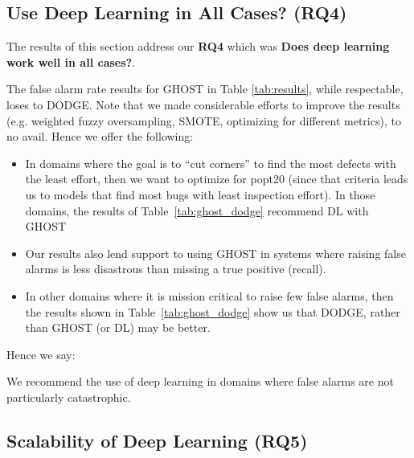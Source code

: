 \documentclass[10pt,compsoc,twocolumn]{IEEEtran}
\newcommand{\bi}{\begin{itemize}}
\newcommand{\ei}{\end{itemize}}
\newcommand{\BLUE}{\color{blue}}
\newcommand{\BLACK}{\color{black}}
\begin{document}
\subsection{Use Deep Learning in All Cases? (RQ4)}
\label{sec:rq4}

The results of this section address our \textbf{RQ4} which was \textbf{Does deep learning work well in all cases?}.

The false alarm rate results for GHOST in Table \ref{tab:results}, while respectable, loses to DODGE.  Note that we made considerable efforts to improve the results (e.g. weighted fuzzy oversampling, SMOTE, optimizing for different metrics), to no avail.
 Hence we offer the following:
 \bi
 \item
 In domains where the goal  is to ``cut corners''
 to find the most defects with the least effort, then we want to optimize for popt20 (since that criteria leads us to models that find most bugs with least inspection effort). In those domains, the results of Table~\ref{tab:ghost_dodge}  recommend DL with GHOST
 \item Our results also lend support to using GHOST in systems where raising false alarms is less disastrous than missing a true positive (recall).
 \BLUE
 \item In other domains where it is mission critical to raise few false alarms, then the results shown in Table~\ref{tab:ghost_dodge} show us that DODGE, rather than GHOST (or DL) may be better. 
 \BLACK
 \ei
Hence we say: 
 
 


\begin{blockquote}
    \noindent
    We recommend the use of deep learning in domains where false alarms are not particularly catastrophic.
\end{blockquote}

\subsection{Scalability of Deep Learning (RQ5)}
\label{sec:rq5}
\end{document}

